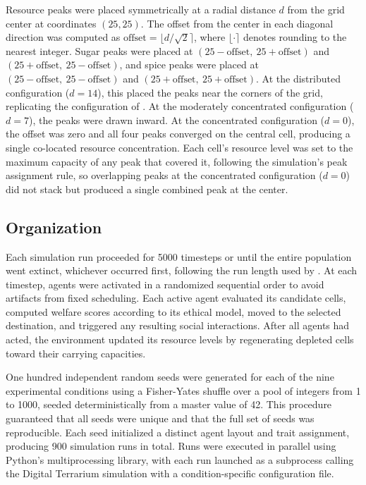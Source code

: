 \documentclass{icsthesis}
\begin{document}
\begin{mainmatter}
			Resource peaks were placed symmetrically at a radial distance $d$ from the grid center at coordinates $(25, 25)$. The offset from the center in each diagonal direction was computed as $\text{offset} = \lfloor d / \sqrt{2} \rceil$, where $\lfloor \cdot \rceil$ denotes rounding to the nearest integer. Sugar peaks were placed at $(25 - \text{offset},\ 25 + \text{offset})$ and $(25 + \text{offset},\ 25 - \text{offset})$, and spice peaks were placed at $(25 - \text{offset},\ 25 - \text{offset})$ and $(25 + \text{offset},\ 25 + \text{offset})$. At the distributed configuration ($d = 14$), this placed the peaks near the corners of the grid, replicating the configuration of \citet{KremerHerman2024}. At the moderately concentrated configuration ($d = 7$), the peaks were drawn inward. At the concentrated configuration ($d = 0$), the offset was zero and all four peaks converged on the central cell, producing a single co-located resource concentration. Each cell's resource level was set to the maximum capacity of any peak that covered it, following the simulation's peak assignment rule, so overlapping peaks at the concentrated configuration ($d = 0$) did not stack but produced a single combined peak at the center. 

			\subsection{Organization}
			Each simulation run proceeded for 5000 timesteps or until the entire population went extinct, whichever occurred first, following the run length used by \citet{KremerHerman2024}. At each timestep, agents were activated in a randomized sequential order to avoid artifacts from fixed scheduling. Each active agent evaluated its candidate cells, computed welfare scores according to its ethical model, moved to the selected destination, and triggered any resulting social interactions. After all agents had acted, the environment updated its resource levels by regenerating depleted cells toward their carrying capacities.

			One hundred independent random seeds were generated for each of the nine experimental conditions using a Fisher-Yates shuffle \citep{Wilson2009} over a pool of integers from 1 to 1000, seeded deterministically from a master value of 42. This procedure guaranteed that all seeds were unique and that the full set of seeds was reproducible. Each seed initialized a distinct agent layout and trait assignment, producing 900 simulation runs in total. Runs were executed in parallel using Python's multiprocessing library, with each run launched as a subprocess calling the Digital Terrarium simulation with a condition-specific configuration file.


\end{mainmatter}
\end{document}
